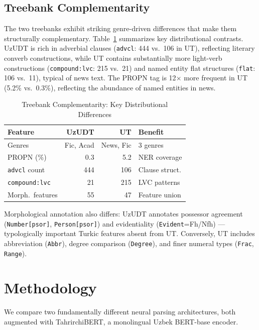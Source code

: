 \documentclass[10pt,conference,a4paper]{IEEEtran_EDM}
\begin{document}
\subsection{Treebank Complementarity}

The two treebanks exhibit striking genre-driven differences that make them structurally complementary. Table~\ref{tab:complement} summarizes key distributional contrasts. UzUDT is rich in adverbial clauses (\texttt{advcl}: 444 vs.\ 106 in UT), reflecting literary converb constructions, while UT contains substantially more light-verb constructions (\texttt{compound:lvc}: 215 vs.\ 21) and named entity flat structures (\texttt{flat}: 106 vs.\ 11), typical of news text. The PROPN tag is 12$\times$ more frequent in UT (5.2\% vs.\ 0.3\%), reflecting the abundance of named entities in news.

\begin{table}[htbp]
\caption{Treebank Complementarity: Key Distributional Differences}
\begin{center}
\begin{tabular}{lrrl}
\toprule
\textbf{Feature} & \textbf{UzUDT} & \textbf{UT} & \textbf{Benefit} \\
\midrule
Genres & Fic, Acad & News, Fic & 3 genres \\
PROPN (\%) & 0.3 & 5.2 & NER coverage \\
\texttt{advcl} count & 444 & 106 & Clause struct. \\
\texttt{compound:lvc} & 21 & 215 & LVC patterns \\
Morph.\ features & 55 & 47 & Feature union \\
\bottomrule
\end{tabular}
\label{tab:complement}
\end{center}
\end{table}

Morphological annotation also differs: UzUDT annotates possessor agreement (\texttt{Number[psor]}, \texttt{Person[psor]}) and evidentiality (\texttt{Evident}=Fh/Nfh) --- typologically important Turkic features absent from UT. Conversely, UT includes abbreviation (\texttt{Abbr}), degree comparison (\texttt{Degree}), and finer numeral types (\texttt{Frac}, \texttt{Range}).

\section{Methodology}

We compare two fundamentally different neural parsing architectures, both augmented with TahrirchiBERT, a monolingual Uzbek BERT-base encoder.
\end{document}
